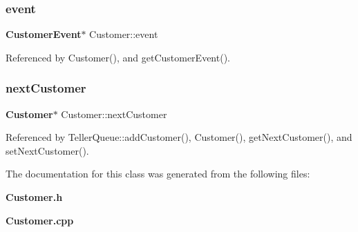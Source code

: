 \subsubsection{event}
{\footnotesize\ttfamily \textbf{ Customer\+Event}$\ast$ Customer\+::event}



Referenced by Customer(), and get\+Customer\+Event().

\mbox{\label{classCustomer_a754b9aeb205889acaaef4cf253940fa6}} 
\subsubsection{next\+Customer}
{\footnotesize\ttfamily \textbf{ Customer}$\ast$ Customer\+::next\+Customer}



Referenced by Teller\+Queue\+::add\+Customer(), Customer(), get\+Next\+Customer(), and set\+Next\+Customer().



The documentation for this class was generated from the following files\+:\begin{DoxyCompactItemize}
\item 
\textbf{ Customer.\+h}\item 
\textbf{ Customer.\+cpp}\end{DoxyCompactItemize}
